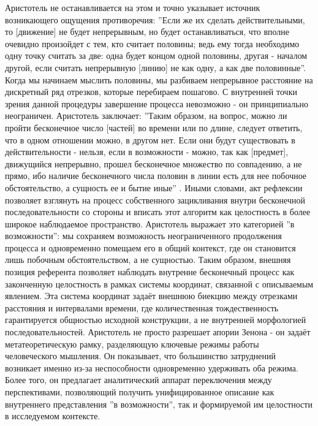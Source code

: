 \documentclass[12pt]{article}
\begin{document}
Аристотель не останавливается на этом и точно указывает источник возникающего ощущения противоречия: ''Если же их сделать действительными, то [движение] не будет непрерывным, но будет останавливаться, что вполне очевидно произойдет с тем, кто считает половины; ведь ему тогда необходимо одну точку считать за две: одна будет концом одной половины, другая - началом другой, если считать непрерывную [линию] не как одну, а как две половинные''. Когда мы начинаем мыслить половины, мы разбиваем непрерывное расстояние на дискретный ряд отрезков, которые перебираем пошагово. С внутренней точки зрения данной процедуры завершение процесса невозможно - он принципиально неограничен. Аристотель заключает: ''Таким образом, на вопрос, можно ли пройти бесконечное число [частей] во времени или по длине, следует ответить, что в одном отношении можно, в другом нет. Если они будут существовать в действительности - нельзя, если в возможности - можно, так как [предмет], движущийся непрерывно, прошел бесконечное множество по совпадению, а не прямо, ибо наличие бесконечного числа половин в линии есть для нее побочное обстоятельство, а сущность ее и бытие иные'' \cite{aristotle-perspectives}. Иными словами, акт рефлексии позволяет взглянуть на процесс собственного зацикливания внутри бесконечной последовательности со стороны и вписать этот алгоритм как целостность в более широкое наблюдаемое пространство. Аристотель выражает это категорией ''в возможности'': мы сохраняем возможность неограниченного продолжения процесса и одновременно помещаем его в общий контекст, где он становится лишь побочным обстоятельством, а не сущностью. Таким образом, внешняя позиция референта позволяет наблюдать внутренне бесконечный процесс как законченную целостность в рамках системы координат, связанной с описываемым явлением. Эта система координат задаёт внешнюю биекцию между отрезками расстояния и интервалами времени, где количественная тождественность гарантируется общностью исходной конструкции, а не внутренней морфологией последовательностей. Аристотель не просто разрешает апории Зенона - он задаёт метатеоретическую рамку, разделяющую ключевые режимы работы человеческого мышления. Он показывает, что большинство затруднений возникает именно из-за неспособности одновременно удерживать оба режима. Более того, он предлагает аналитический аппарат переключения между перспективами, позволяющий получить унифицированное описание как внутреннего представления ''в возможности'', так и формируемой им целостности в исследуемом контексте.
\end{document}
